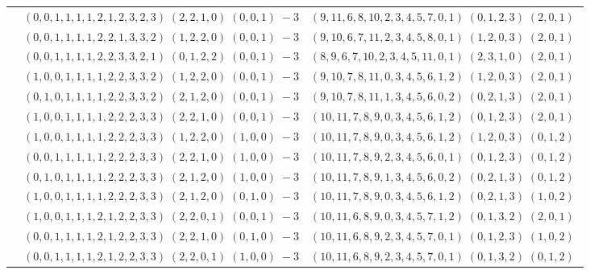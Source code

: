 \documentclass[11pt]{article}
\begin{document}
\begin{longtable}[l]{|c|c|c|}
 \cline{2-3} 
 & $(0 ,0 ,1 ,1 ,1 ,1 ,2 ,1 ,2 ,3 ,2 ,3) \;(2 ,2 ,1 ,0) \;(0 ,0 ,1) \;-3$ & $(9 ,11 ,6 ,8 ,10 ,2 ,3 ,4 ,5 ,7 ,0 ,1) \;(0 ,1 ,2 ,3) \;(2 ,0 ,1) \;$\\ 
 \cline{2-3} 
 & $(0 ,0 ,1 ,1 ,1 ,1 ,2 ,2 ,1 ,3 ,3 ,2) \;(1 ,2 ,2 ,0) \;(0 ,0 ,1) \;-3$ & $(9 ,10 ,6 ,7 ,11 ,2 ,3 ,4 ,5 ,8 ,0 ,1) \;(1 ,2 ,0 ,3) \;(2 ,0 ,1) \;$\\ 
 \cline{2-3} 
 & $(0 ,0 ,1 ,1 ,1 ,1 ,2 ,2 ,3 ,3 ,2 ,1) \;(0 ,1 ,2 ,2) \;(0 ,0 ,1) \;-3$ & $(8 ,9 ,6 ,7 ,10 ,2 ,3 ,4 ,5 ,11 ,0 ,1) \;(2 ,3 ,1 ,0) \;(2 ,0 ,1) \;$\\ 
 \cline{2-3} 
 & $(1 ,0 ,0 ,1 ,1 ,1 ,1 ,2 ,2 ,3 ,3 ,2) \;(1 ,2 ,2 ,0) \;(0 ,0 ,1) \;-3$ & $(9 ,10 ,7 ,8 ,11 ,0 ,3 ,4 ,5 ,6 ,1 ,2) \;(1 ,2 ,0 ,3) \;(2 ,0 ,1) \;$\\ 
 \cline{2-3} 
 & $(0 ,1 ,0 ,1 ,1 ,1 ,1 ,2 ,2 ,3 ,3 ,2) \;(2 ,1 ,2 ,0) \;(0 ,0 ,1) \;-3$ & $(9 ,10 ,7 ,8 ,11 ,1 ,3 ,4 ,5 ,6 ,0 ,2) \;(0 ,2 ,1 ,3) \;(2 ,0 ,1) \;$\\ 
 \cline{2-3} 
 & $(1 ,0 ,0 ,1 ,1 ,1 ,1 ,2 ,2 ,2 ,3 ,3) \;(2 ,2 ,1 ,0) \;(0 ,0 ,1) \;-3$ & $(10 ,11 ,7 ,8 ,9 ,0 ,3 ,4 ,5 ,6 ,1 ,2) \;(0 ,1 ,2 ,3) \;(2 ,0 ,1) \;$\\ 
 \cline{2-3} 
 & $(1 ,0 ,0 ,1 ,1 ,1 ,1 ,2 ,2 ,2 ,3 ,3) \;(1 ,2 ,2 ,0) \;(1 ,0 ,0) \;-3$ & $(10 ,11 ,7 ,8 ,9 ,0 ,3 ,4 ,5 ,6 ,1 ,2) \;(1 ,2 ,0 ,3) \;(0 ,1 ,2) \;$\\ 
 \cline{2-3} 
 & $(0 ,0 ,1 ,1 ,1 ,1 ,1 ,2 ,2 ,2 ,3 ,3) \;(2 ,2 ,1 ,0) \;(1 ,0 ,0) \;-3$ & $(10 ,11 ,7 ,8 ,9 ,2 ,3 ,4 ,5 ,6 ,0 ,1) \;(0 ,1 ,2 ,3) \;(0 ,1 ,2) \;$\\ 
 \cline{2-3} 
 & $(0 ,1 ,0 ,1 ,1 ,1 ,1 ,2 ,2 ,2 ,3 ,3) \;(2 ,1 ,2 ,0) \;(1 ,0 ,0) \;-3$ & $(10 ,11 ,7 ,8 ,9 ,1 ,3 ,4 ,5 ,6 ,0 ,2) \;(0 ,2 ,1 ,3) \;(0 ,1 ,2) \;$\\ 
 \cline{2-3} 
 & $(1 ,0 ,0 ,1 ,1 ,1 ,1 ,2 ,2 ,2 ,3 ,3) \;(2 ,1 ,2 ,0) \;(0 ,1 ,0) \;-3$ & $(10 ,11 ,7 ,8 ,9 ,0 ,3 ,4 ,5 ,6 ,1 ,2) \;(0 ,2 ,1 ,3) \;(1 ,0 ,2) \;$\\ 
 \cline{2-3} 
 & $(1 ,0 ,0 ,1 ,1 ,1 ,2 ,1 ,2 ,2 ,3 ,3) \;(2 ,2 ,0 ,1) \;(0 ,0 ,1) \;-3$ & $(10 ,11 ,6 ,8 ,9 ,0 ,3 ,4 ,5 ,7 ,1 ,2) \;(0 ,1 ,3 ,2) \;(2 ,0 ,1) \;$\\ 
 \cline{2-3} 
 & $(0 ,0 ,1 ,1 ,1 ,1 ,2 ,1 ,2 ,2 ,3 ,3) \;(2 ,2 ,1 ,0) \;(0 ,1 ,0) \;-3$ & $(10 ,11 ,6 ,8 ,9 ,2 ,3 ,4 ,5 ,7 ,0 ,1) \;(0 ,1 ,2 ,3) \;(1 ,0 ,2) \;$\\ 
 \cline{2-3} 
 & $(0 ,0 ,1 ,1 ,1 ,1 ,2 ,1 ,2 ,2 ,3 ,3) \;(2 ,2 ,0 ,1) \;(1 ,0 ,0) \;-3$ & $(10 ,11 ,6 ,8 ,9 ,2 ,3 ,4 ,5 ,7 ,0 ,1) \;(0 ,1 ,3 ,2) \;(0 ,1 ,2) \;$\\ 

\end{longtable}
\end{document}
